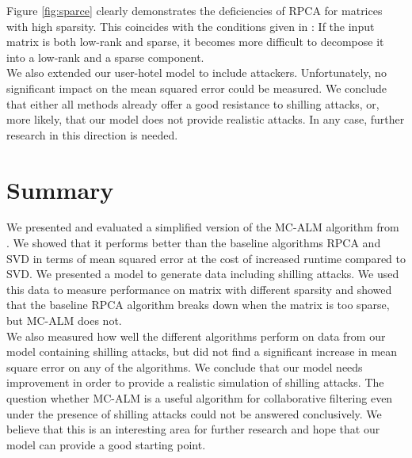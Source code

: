 \documentclass[10pt,conference,compsocconf]{IEEEtran}
\begin{document}
Figure \ref{fig:sparce} clearly demonstrates the deficiencies of RPCA for
matrices with high sparsity. This coincides with the conditions given in
\cite{rpcapaper}: If the input matrix is both low-rank and sparse, it becomes 
more difficult to decompose it into a low-rank and a sparse component.\\

We also extended our user-hotel model to include attackers.
Unfortunately, no significant impact on the mean squared error could be
measured. We conclude that either all methods already offer a good resistance to
shilling attacks, or, more likely, that our model does not provide realistic
attacks. In any case, further research in this direction is needed.

\section{Summary}
We presented and evaluated a simplified version of the MC-ALM algorithm from
\cite{almpaper}. We showed that it performs better than the baseline algorithms
RPCA and SVD in terms of mean squared error at the cost of increased runtime
compared to SVD. We presented a model to generate data including shilling
attacks. We used this data to measure performance on matrix with different
sparsity and showed that the baseline RPCA algorithm breaks down when the matrix
is too sparse, but MC-ALM does not. \\

We also measured how well the different algorithms perform on data from our
model containing shilling attacks, but did not find a significant increase in
mean square error on any of the algorithms. We conclude that our model needs
improvement in order to provide a realistic simulation of shilling attacks. The
question whether MC-ALM is a useful algorithm for collaborative filtering even
under the presence of shilling attacks could not be answered conclusively. We
believe that this is an interesting area for further research and hope that our
model can provide a good starting point.




\end{document}

